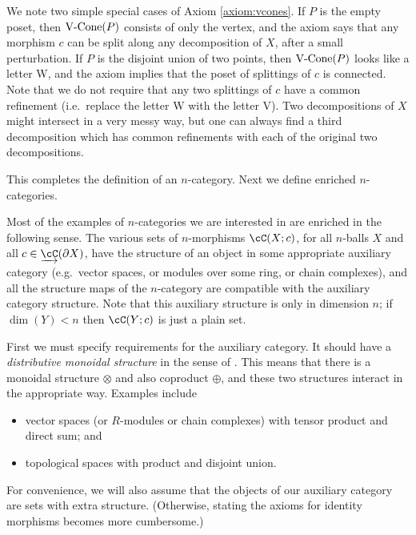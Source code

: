 We note two simple special cases of Axiom \ref{axiom:vcones}.
If $P$ is the empty poset, then $\text{V-Cone}(P)$ consists of only the vertex, and the axiom says that any morphism $c$
can be split along any decomposition of $X$, after a small perturbation.
If $P$ is the disjoint union of two points, then $\text{V-Cone}(P)$ looks like a letter W, and the axiom implies that the
poset of splittings of $c$ is connected.
Note that we do not require that any two splittings of $c$ have a common refinement (i.e.\ replace the letter W with the letter V).
Two decompositions of $X$ might intersect in a very messy way, but one can always find a third
decomposition which has common refinements with each of the original two decompositions.


\medskip

This completes the definition of an $n$-category.
Next we define enriched $n$-categories.

\medskip


Most of the examples of $n$-categories we are interested in are enriched in the following sense.
The various sets of $n$-morphisms $\cC(X; c)$, for all $n$-balls $X$ and
all $c\in \cl{\cC}(\bd X)$, have the structure of an object in some appropriate auxiliary category
(e.g.\ vector spaces, or modules over some ring, or chain complexes),
and all the structure maps of the $n$-category are compatible with the auxiliary
category structure.
Note that this auxiliary structure is only in dimension $n$; if $\dim(Y) < n$ then 
$\cC(Y; c)$ is just a plain set.

First we must specify requirements for the auxiliary category.
It should have a {\it distributive monoidal structure} in the sense of 
\cite{1010.4527}.
This means that there is a monoidal structure $\otimes$ and also coproduct $\oplus$,
and these two structures interact in the appropriate way.
Examples include 
\begin{itemize}
\item vector spaces (or $R$-modules or chain complexes) with tensor product and direct sum; and
\item topological spaces with product and disjoint union.
\end{itemize}
For convenience, we will also assume that the objects of our auxiliary category are sets with extra structure.
(Otherwise, stating the axioms for identity morphisms becomes more cumbersome.)

